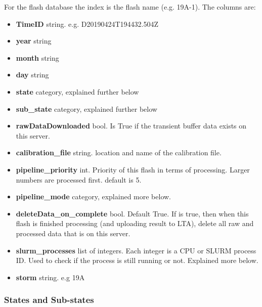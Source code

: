 \documentclass[]{article}
\begin{document}
For the flash database the index is the flash name (e.g. 19A-1). The columns are:
\begin{itemize}
	\item \textbf{TimeID} string. e.g. D20190424T194432.504Z
	\item \textbf{year} string
	\item \textbf{month} string
	\item \textbf{day} string
	\item \textbf{state} category, explained further below
	\item \textbf{sub\_state} category, explained further below
	\item \textbf{rawDataDownloaded} bool. Is True if the transient buffer data exists on this server.
	\item \textbf{calibration\_file} string. location and name of the calibration file.
	\item \textbf{pipeline\_priority} int. Priority of this flash in terms of processing. Larger numbers are processed first. default is 5.
	\item \textbf{pipeline\_mode} category, explained more below.
	\item \textbf{deleteData\_on\_complete} bool. Default True. If is true, then when this flash is finished processing (and uploading result to LTA), delete all raw and processed data that is on this server.
	\item \textbf{slurm\_processes} list of integers. Each integer is a CPU or SLURM process ID. Used to check if the process is still running or not. Explained more below. 
	\item \textbf{storm} string. e.g 19A
\end{itemize}

\subsubsection{States and Sub-states}
\end{document}
